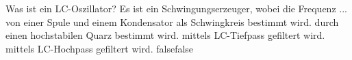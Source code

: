     {Was ist ein LC-Oszillator? Es ist ein Schwingungserzeuger, wobei die Frequenz ...}
    {von einer Spule und einem Kondensator als Schwingkreis bestimmt wird.}
    {durch einen hochstabilen Quarz bestimmt wird.}
    {mittels LC-Tiefpass gefiltert wird.}
    {mittels LC-Hochpass gefiltert wird.}
    {false}{false}